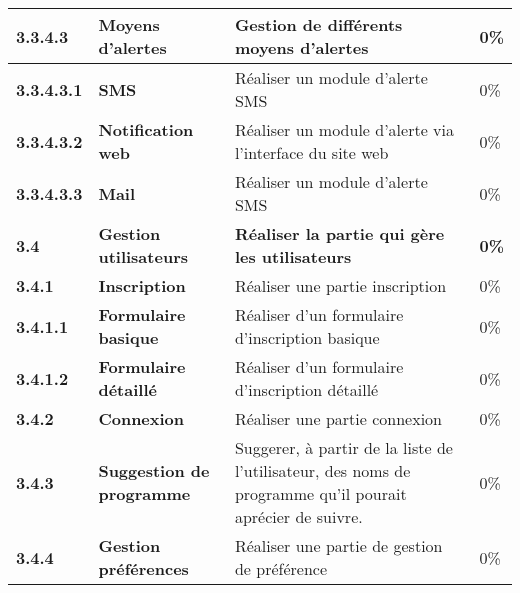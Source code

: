 \begin{supertabular}{|p{2.8cm} p{6cm}|p{5cm}|R{2cm}|}
  \hspace{12pt}
  \textbf{3.3.4.3}  & \textbf{Moyens d'alertes} & Gestion de différents moyens d'alertes  & 0\% \\
  \hline


  \hspace{18pt}
  \textbf{3.3.4.3.1}  & \textbf{SMS} & Réaliser un module d'alerte SMS  & 0\% \\
  \hline

  \hspace{18pt}
  \textbf{3.3.4.3.2}  & \textbf{Notification web} & Réaliser un module d'alerte via l'interface du site web & 0\% \\
  \hline

  \hspace{18pt}
  \textbf{3.3.4.3.3}  & \textbf{Mail} & Réaliser un module d'alerte SMS & 0\% \\
  \hline






  \textbf{3.4}  & \textbf{Gestion utilisateurs} & \textbf{Réaliser la partie qui gère les utilisateurs} & \textbf{0\%} \\
  \hline

  \hspace{6pt}
  \textbf{3.4.1}  & \textbf{Inscription} & Réaliser une partie inscription & 0\% \\
  \hline

  \hspace{12pt}
  \textbf{3.4.1.1}  & \textbf{Formulaire basique} & Réaliser d'un formulaire d'inscription basique & 0\% \\
  \hline

  \hspace{12pt}
  \textbf{3.4.1.2}  & \textbf{Formulaire détaillé} & Réaliser d'un formulaire d'inscription détaillé & 0\% \\
  \hline

  \hspace{6pt}
  \textbf{3.4.2}  & \textbf{Connexion} & Réaliser une partie connexion & 0\% \\
  \hline

  \hspace{6pt}
  \textbf{3.4.3}  & \textbf{Suggestion de programme} & Suggerer, à partir de la liste de l'utilisateur, des noms de programme qu'il pourait aprécier de suivre. & 0\% \\
  \hline

  \hspace{6pt}
  \textbf{3.4.4}  & \textbf{Gestion préférences} & Réaliser une partie de gestion de préférence & 0\% \\
  \hline


\end{supertabular}
